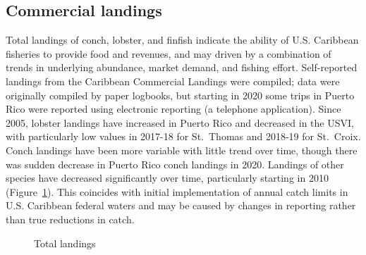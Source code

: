 \documentclass[
  letterpaper,
  oneside,
  open=any]{scrbook}
\begin{document}
\subsection{Commercial landings}\label{commercial-landings}

Total landings of conch, lobster, and finfish indicate the ability of
U.S. Caribbean fisheries to provide food and revenues, and may driven by
a combination of trends in underlying abundance, market demand, and
fishing effort. Self-reported landings from the Caribbean Commercial
Landings were compiled; data were originally compiled by paper logbooks,
but starting in 2020 some trips in Puerto Rico were reported using
electronic reporting (a telephone application). Since 2005, lobster
landings have increased in Puerto Rico and decreased in the USVI, with
particularly low values in 2017-18 for St.~Thomas and 2018-19 for
St.~Croix. Conch landings have been more variable with little trend over
time, though there was sudden decrease in Puerto Rico conch landings in
2020. Landings of other species have decreased significantly over time,
particularly starting in 2010 (Figure~\ref{fig-totalland}). This
coincides with initial implementation of annual catch limits in U.S.
Caribbean federal waters and may be caused by changes in reporting
rather than true reductions in catch.

\begin{figure}


\caption{\label{fig-totalland}Total landings}

\end{figure}%
\end{document}
